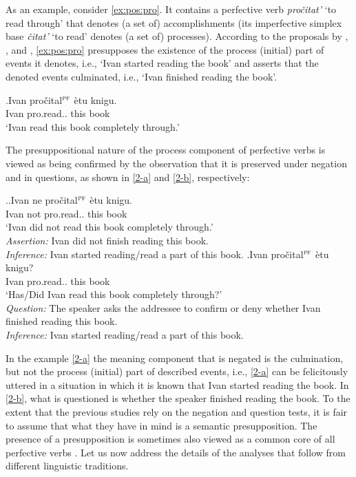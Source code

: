 As an example, consider \ref{ex:pos:pro}. It contains a perfective verb  \textit{pro\v{c}itat'} `to read through' that denotes (a set of) accomplishments (its imperfective simplex base \textit{\v{c}itat'} `to read' denotes (a set of) processes). According to the proposals by \citet{Paducheva:96, Paducheva:11}, \citet{Romanova:06}, and \citet{Docekal:09}, \ref{ex:pos:pro} presupposes the existence of the process (initial) part of events it denotes, i.e., `Ivan started reading the book' and asserts that the denoted events culminated, i.e., `Ivan finished reading the book'.

\exg.\label{ex:pos:pro}Ivan pro\v{c}ital$^{\textsc{pf}}$ \`{e}tu knigu.\\
Ivan pro.read.. this book\\
\trans `Ivan read this book completely through.'

The presuppositional nature of the process component of perfective verbs  is viewed as being confirmed by the observation that it is preserved under negation and in questions, as shown in \ref{2-a} and \ref{2-b}, respectively: 

\ex.\label{2}\ag.\label{2-a}Ivan ne pro\v{c}ital$^{\textsc{pf}}$ \`{e}tu knigu.\\
Ivan not pro.read.. this book\\
\trans `Ivan did not read this book completely through.'\\
\textit{Assertion:} Ivan did not finish reading this book.\\
\textit{Inference:} Ivan started reading/read a part of this book.
\bg.\label{2-b}Ivan pro\v{c}ital$^{\textsc{pf}}$ \`{e}tu knigu?\\
Ivan pro.read.. this book\\
\trans `Has/Did Ivan read this book completely through?'\\
\textit{Question:} The speaker asks the addressee to confirm or deny whether Ivan finished reading this book.\\
\textit{Inference:} Ivan started reading/read a part of this book.

In the example \ref{2-a} the meaning component that is negated is the culmination, but not the process (initial) part of described events, i.e., \ref{2-a} can be felicitously uttered in a situation in which it is known that Ivan started reading the book. In \ref{2-b}, what is questioned is whether the speaker finished reading the book. To the extent that the previous studies rely on the negation and question tests, it is fair to assume that what they have in mind is a semantic presupposition. The presence of a presupposition is sometimes \citep[e.g., by][]{Paducheva:96, Romanova:04} also viewed as a common core of all perfective verbs . Let us now address the details of the analyses that follow from different linguistic traditions.

